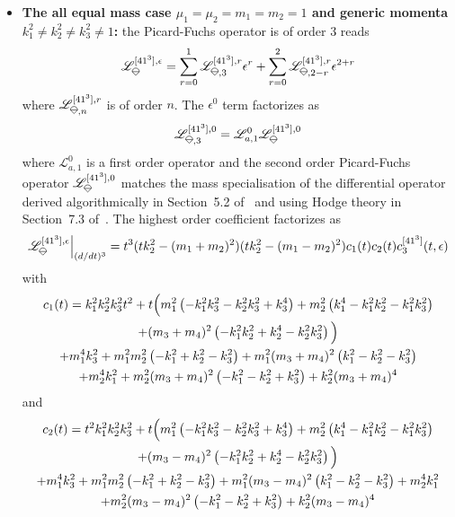 \documentclass[a4paper,12pt]{article}
\numberwithin{equation}{section}
\numberwithin{figure}{section}
\newcommand{\IceCream}{	\begin{tikzpicture}[scale=0.05]
	\draw[color = black, fill=none] (2,0) arc(0:180:2);
		\draw [black] (-2,0) to (2,0);
		\draw [black] (-2,0) to (0,-2);
                	\draw [black] (2,0) to (0,-2);
	\end{tikzpicture}}
\begin{document}
\begin{itemize}
	
	\item \textbf{ The all equal mass case
		$\mu_1=\mu_2=m_1=m_2=1$ and generic momenta $k_1^2\neq
                k_2^2\neq
		k_3^2\neq 1$:} the Picard-Fuchs operator is of order 3
	reads
	\begin{equation}
		\mathscr{L}_{\IceCream}^{[41^3],\epsilon}=\sum_{r=0}^1
		\mathscr{L}_{\IceCream,3}^{[41^3],r} \epsilon^r+ \sum_{r=0}^2   \mathscr{L}_{\IceCream,2-r}^{[41^3],r} \epsilon^{2+r}
	\end{equation}
	where $ \mathscr{L}_{\IceCream,n}^{[41^3],r}$  is of order $n$. The
	$\epsilon^0$ term factorizes as
	\begin{equation}
		\mathscr{L}_{\IceCream,3}^{[41^3],0}=\mathscr{L}_{a,1}^0 \mathscr{L}_{\IceCream}^{[41^3],0}      
	\end{equation}
	where $\mathscr{L}_{a,1}^0$ is a first order operator   and the second order
	Picard-Fuchs operator  $\mathscr{L}_{\IceCream}^{[41^3] ,0}
	$ matches the mass specialisation of the differential
	operator derived algorithmically in Section~5.2
	of~\cite{Lairez:2022zkj} and using Hodge theory in
	Section~7.3 of~\cite{Doran:2023yzu}.
	The highest order coefficient factorizes as
	\begin{equation}
		\mathscr{L}_{\IceCream}^{[41^3],\epsilon}\Big|_{(d/dt)^3}=t^3(tk_2^2-(m_1+m_2)^2)(tk_2^2-(m_1-m_2)^2) c_1(t) c_2(t)c^{[41^3]}_3(t,\epsilon)   
	\end{equation}
	with
	\begin{multline}
		c_1(t)=   k_{1}^2 k_{2}^2 k_{3}^2 t^2 +t\Big(m_{1}^2 \left(-k_{1}^2 k_{3}^2-k_{2}^2 k_{3}^2+k_{3}^4\right)+m_{2}^2 \left(k_{1}^4-k_{1}^2
		k_{2}^2-k_{1}^2 k_{3}^2\right)\cr+(m_{3}+m_{4})^2
		\left(-k_{1}^2 k_{2}^2+k_{2}^4-k_{2}^2
		k_{3}^2\right)\Big)\cr
		+m_{1}^4 k_{3}^2+m_{1}^2 m_{2}^2 \left(-k_{1}^2+k_{2}^2-k_{3}^2\right)+m_{1}^2 (m_{3}+m_{4})^2
		\left(k_{1}^2-k_{2}^2-k_{3}^2\right)\cr+m_{2}^4 k_{1}^2+m_{2}^2 (m_{3}+m_{4})^2
		\left(-k_{1}^2-k_{2}^2+k_{3}^2\right)+k_{2}^2 (m_{3}+m_{4})^4
	\end{multline}
	and
	\begin{multline}
		c_2(t)=t^2 k_{1}^2 k_{2}^2 k_{3}^2+t\Big(m_{1}^2 \left(-k_{1}^2 k_{3}^2-k_{2}^2 k_{3}^2+k_{3}^4\right)+m_{2}^2 \left(k_{1}^4-k_{1}^2
		k_{2}^2-k_{1}^2 k_{3}^2\right)\cr+(m_{3}-m_{4})^2 \left(-k_{1}^2 k_{2}^2+k_{2}^4-k_{2}^2 k_{3}^2\right)\Big)\cr
		+m_{1}^4 k_{3}^2+m_{1}^2 m_{2}^2 \left(-k_{1}^2+k_{2}^2-k_{3}^2\right)+m_{1}^2 (m_{3}-m_{4})^2
		\left(k_{1}^2-k_{2}^2-k_{3}^2\right)+m_{2}^4 k_{1}^2\cr+m_{2}^2 (m_{3}-m_{4})^2
		\left(-k_{1}^2-k_{2}^2+k_{3}^2\right)+k_{2}^2 (m_{3}-m_{4})^4

\end{multline}
\end{itemize}
\end{document}

